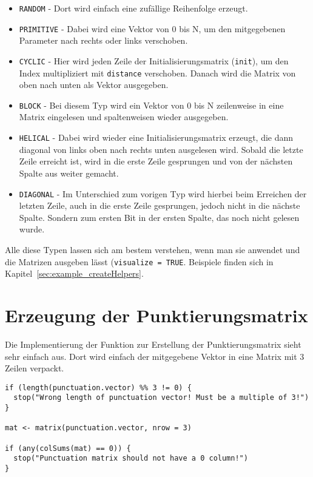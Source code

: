 \begin{itemize}
\item \texttt{RANDOM} - Dort wird einfach eine zufällige Reihenfolge erzeugt.
\item \texttt{PRIMITIVE} - Dabei wird eine Vektor von 0 bis N, um den mitgegebenen Parameter nach rechts oder links verschoben.
\item \texttt{CYCLIC} - Hier wird jeden Zeile der Initialisierungsmatrix (\texttt{init}), um den Index multipliziert mit \texttt{distance} verschoben. Danach wird die Matrix von oben nach unten als Vektor ausgegeben.
\item \texttt{BLOCK} - Bei diesem Typ wird ein Vektor von 0 bis N zeilenweise in eine Matrix eingelesen und spaltenweisen wieder ausgegeben.
\item \texttt{HELICAL} - Dabei wird wieder eine Initialisierungsmatrix erzeugt, die dann diagonal von links oben nach rechts unten ausgelesen wird. Sobald die letzte Zeile erreicht ist, wird in die erste Zeile gesprungen und von der nächsten Spalte aus weiter gemacht.
\item \texttt{DIAGONAL} - Im Unterschied zum vorigen Typ wird hierbei beim Erreichen der letzten Zeile, auch in die erste Zeile gesprungen, jedoch nicht in die nächste Spalte. Sondern zum ersten Bit in der ersten Spalte, das noch nicht gelesen wurde.
\end{itemize}

Alle diese Typen lassen sich am bestem verstehen, wenn man sie anwendet und die Matrizen ausgeben lässt (\texttt{visualize = TRUE}. Beispiele finden sich in Kapitel~\ref{sec:example_createHelpers}.

\FloatBarrier
\section{Erzeugung der Punktierungsmatrix}
\label{sec:implementation_puncturing}
Die Implementierung der Funktion zur Erstellung der Punktierungsmatrix sieht sehr einfach aus. Dort wird einfach der mitgegebene Vektor in eine Matrix mit 3 Zeilen verpackt. 

\begin{lstlisting}[caption=Implementierung von \texttt{TurboGetPunctuationMatrix}, label={lst:implemenation_TurboGetPunctuationMatrix}, float=!th]
if (length(punctuation.vector) %% 3 != 0) {
  stop("Wrong length of punctuation vector! Must be a multiple of 3!")
}

mat <- matrix(punctuation.vector, nrow = 3)

if (any(colSums(mat) == 0)) {
  stop("Punctuation matrix should not have a 0 column!")
}
\end{lstlisting}

